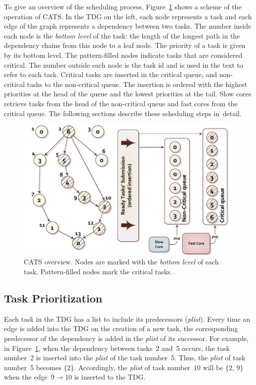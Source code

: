 To give an overview of the scheduling process, Figure~\ref{botlevels} shows a scheme of the operation of CATS. In the TDG on the left, each node represents a task and each edge of the graph represents a dependency between two tasks. The number inside each node is the \textit{bottom level} of the task: the length of the longest path in the dependency chains from this node to a leaf node. The priority of a task is given by its bottom level. The pattern-filled nodes indicate tasks that are considered critical. The number outside each node is the task id and is used in the text to refer to each task. Critical tasks are inserted in the critical queue, and non-critical tasks to the non-critical queue. The insertion is ordered with the highest priorities at the head of the queue and the lowest priorities at the tail. Slow cores retrieve tasks from the head of the non-critical queue and fast cores from the critical queue. The following sections describe these scheduling steps in~detail.


\begin{figure}[t]
\includegraphics[width=\columnwidth]{figures/fig1.pdf} 
\centering
\caption{CATS overview. Nodes are marked with the \textit{bottom level} of each task. Pattern-filled nodes mark the critical tasks.}
\label{botlevels}
\vspace{-0.5cm}
\end{figure}


\subsection{Task Prioritization}

Each task in the TDG has a list to include its predecessors (\textit{plist}). Every time an edge is added into the TDG on the creation of a new task, the corresponding predecessor of the dependency is added in the \textit{plist} of its successor. For example, in Figure~\ref{botlevels}, when the dependency between tasks~2 and~5 occurs, the task number~2 is inserted into the \textit{plist} of the task number~5. Thus, the \textit{plist} of task number~5 becomes $\{$2$\}$. Accordingly, the \textit{plist} of task number~10 will be $\{$2, 9$\}$ when the edge~9$\rightarrow$10 is inserted to the TDG. 

